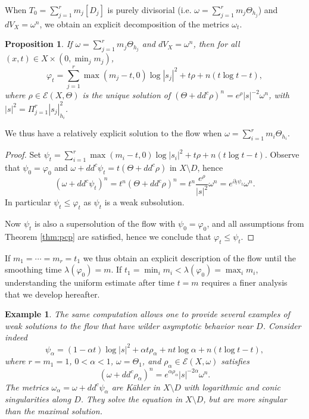 \documentclass[10pt,a4paper]{amsart}
\numberwithin{equation}{section}
\newtheorem{prop}[theorem]{Proposition}
\newtheorem{exa}[theorem]{Example}
\newcommand{\f}{\varphi}
\newcommand{\p}{\psi}
\newcommand \la {\lambda}
\begin{document}
When $T_0=\sum_{j=1}^r m_j[D_j]$ is purely divisorial
(i.e. $\omega=\sum_{j=1}^r m_j \Theta_{h_j}$) and $dV_X=\omega^n$,
we obtain an explicit decomposition of the metrics $\omega_t$.


\begin{prop} \label{pro:decompo}
If   $\omega=\sum_{j=1}^r m_j \Theta_{h_j}$ and $dV_X=\omega^n$, then for all $(x,t) \in X \times (0,\min_j m_j)$,
$$
\f_t=\sum_{j=1}^r \max(m_j-t,0) \log|s_j|^2 +t \rho +n(t\log t-t), 
$$
where $\rho \in {\mathcal E}(X,\Theta)$ is the unique solution of $(\Theta+dd^c \rho)^n =e^{\rho} |s|^{-2} \omega^n$,
with $|s|^2=\Pi_{j=1}^r |s_j|^{2}_{h_i}$.
\end{prop}

We thus have a relatively explicit solution to the flow when  $\omega=\sum_{i=1}^r m_i \Theta_{h_i}$. 


\begin{proof}
Set $\p_t=\sum_{i=1}^r \max(m_i-t,0) \log|s_i|^2+t \rho+n(t\log t-t)$. Observe that 
$\p_0=\f_0$ and $\omega+dd^c \p_t=t (\Theta+dd^c \rho)$ in $X \setminus D$,
hence
$$
(\omega+dd^c \p_t)^n=t^n (\Theta+dd^c \rho)^n=t^n \frac{e^{\rho}}{|s|^2} \omega^n=e^{\partial_t \p_t} \omega^n.
$$
In particular $\p_t \leq \f_t$ as $\p_t$ is a weak subsolution.

Now $\p_t$ is also a supersolution of the flow with $\p_0=\f_0$,
and all assumptions from Theorem \ref{thm:pcp} are satisfied, hence we conclude that $\f_t \leq \p_t$.
\end{proof}


If $m_1=\cdots=m_r=t_1$ we thus obtain an explicit description of the flow until the smoothing
time $\la(\f_0)=m$. If $t_1=\min_i m_i < \la(\f_0)=\max_i m_i$, understanding
the uniform estimate after time $t=m$ requires a finer analysis that we develop hereafter.



\begin{exa} \label{exa:notunique}
The same computation allows one to provide several examples of weak solutions to the
flow that have wilder asymptotic behavior near $D$. Consider indeed
$$
\p_{\alpha}=(1-\alpha t) \log |s|^2+ \alpha t \rho_{\alpha}+nt \log \alpha+n (t \log t-t),
$$
where $r=m_1=1$,
$0<\alpha<1$, $\omega= \Theta_{1}$,
and $\rho_{\alpha} \in {\mathcal E}(X,\omega)$ satisfies
$$
(\omega+dd^c \rho_{\alpha})^n=e^{\alpha \rho_{\alpha}} |s|^{-2\alpha} \omega^n.
$$
The metrics $\omega_{\alpha}=\omega+dd^c \p_{\alpha}$ are K\"ahler   in $X \setminus D$ with 
 logarithmic and conic singularities along $D$. They solve the  equation in 
$X \setminus D$, but   are   more singular than the maximal solution.
\end{exa}
\end{document}
